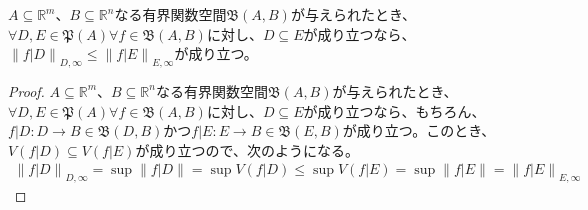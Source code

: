 \documentclass[dvipdfmx]{jsarticle}
\begin{document}
\begin{thm}\label{4.1.11.3}
$A \subseteq \mathbb{R}^{m}$、$B \subseteq \mathbb{R}^{n}$なる有界関数空間$\mathfrak{B}(A,B)$が与えられたとき、$\forall D,E \in \mathfrak{P}(A)\forall f \in \mathfrak{B}(A,B)$に対し、$D \subseteq E$が成り立つなら、$\left\| f|D \right\|_{D,\infty} \leq \left\| f|E \right\|_{E,\infty}$が成り立つ。
\end{thm}
\begin{proof}
$A \subseteq \mathbb{R}^{m}$、$B \subseteq \mathbb{R}^{n}$なる有界関数空間$\mathfrak{B}(A,B)$が与えられたとき、$\forall D,E \in \mathfrak{P}(A)\forall f \in \mathfrak{B}(A,B)$に対し、$D \subseteq E$が成り立つなら、もちろん、$f|D:D \rightarrow B \in \mathfrak{B}(D,B)$かつ$f|E:E \rightarrow B \in \mathfrak{B}(E,B)$が成り立つ。このとき、$V\left( f|D \right) \subseteq V\left( f|E \right)$が成り立つので、次のようになる。
\begin{align*}
\left\| f|D \right\|_{D,\infty} = \sup\left\| f|D \right\| = \sup{V\left( f|D \right)} \leq \sup{V\left( f|E \right)} = \sup\left\| f|E \right\| = \left\| f|E \right\|_{E,\infty}
\end{align*}
\end{proof}
\end{document}
